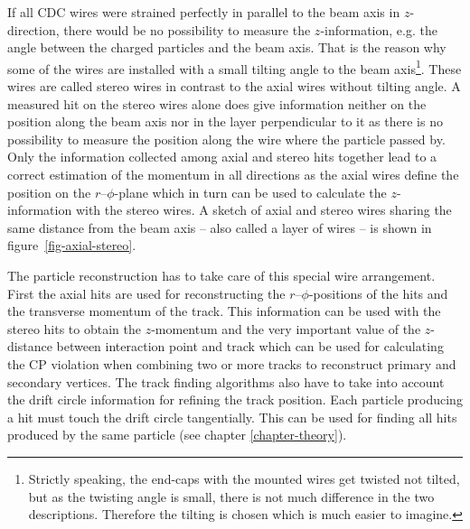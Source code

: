 If all CDC wires were strained perfectly in parallel to the beam axis in $z$-direction, there would be no possibility to measure the $z$-information, e.g. the angle between the charged particles and the beam axis. That is the reason why some of the wires are installed with a small tilting angle to the beam axis\footnote{Strictly speaking, the end-caps with the mounted wires get twisted not tilted, but as the twisting angle is small, there is not much difference in the two descriptions. Therefore the tilting is chosen which is much easier to imagine.}. These wires are called stereo wires in contrast to the axial wires without tilting angle. A measured hit on the stereo wires alone does give information neither on the position along the beam axis nor in the layer perpendicular to it as there is no possibility to measure the position along the wire where the particle passed by. Only the information collected among axial and stereo hits together lead to a correct estimation of the momentum in all directions as the axial wires define the position on the $r$--$\phi$-plane which in turn can be used to calculate the $z$-information with the stereo wires. A sketch of axial and stereo wires sharing the same distance from the beam axis -- also called a layer of wires -- is shown in figure~\ref{fig-axial-stereo}. 

The particle reconstruction has to take care of this special wire arrangement. First the axial hits are used for reconstructing the $r$--$\phi$-positions of the hits and the transverse momentum of the track. This information can be used with the stereo hits to obtain the $z$-momentum and the very important value of the $z$-distance between interaction point and track which can be used for calculating the CP violation when combining two or more tracks to reconstruct primary and secondary vertices. The track finding algorithms also have to take into account the drift circle information for refining the track position. Each particle producing a hit must touch the drift circle tangentially. This can be used for finding all hits produced by the same particle (see chapter \ref{chapter-theory}).

